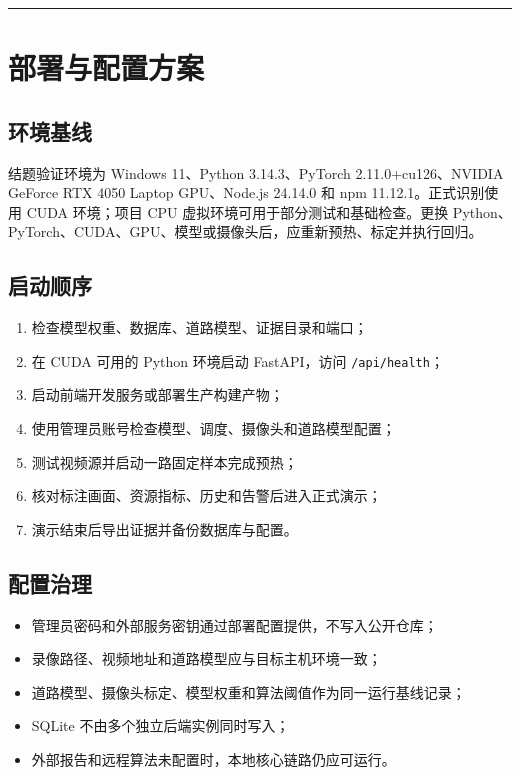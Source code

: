 \begin{center}\rule{0.5\linewidth}{0.5pt}\end{center}

\section{部署与配置方案}\label{design-ux90e8ux7f72ux4e0eux914dux7f6eux65b9ux6848}

\subsection{环境基线}\label{design-ux73afux5883ux57faux7ebf}

结题验证环境为 Windows 11、Python 3.14.3、PyTorch 2.11.0+cu126、NVIDIA GeForce RTX 4050 Laptop GPU、Node.js 24.14.0 和 npm 11.12.1。正式识别使用 CUDA 环境；项目 CPU 虚拟环境可用于部分测试和基础检查。更换 Python、PyTorch、CUDA、GPU、模型或摄像头后，应重新预热、标定并执行回归。

\subsection{启动顺序}\label{design-ux542fux52a8ux987aux5e8f}

\begin{enumerate}
\def\labelenumi{\arabic{enumi}.}
\tightlist
\item
  检查模型权重、数据库、道路模型、证据目录和端口；
\item
  在 CUDA 可用的 Python 环境启动 FastAPI，访问 \texttt{/\allowbreak{}api/\allowbreak{}health}；
\item
  启动前端开发服务或部署生产构建产物；
\item
  使用管理员账号检查模型、调度、摄像头和道路模型配置；
\item
  测试视频源并启动一路固定样本完成预热；
\item
  核对标注画面、资源指标、历史和告警后进入正式演示；
\item
  演示结束后导出证据并备份数据库与配置。
\end{enumerate}

\subsection{配置治理}\label{design-ux914dux7f6eux6cbbux7406}

\begin{itemize}
\tightlist
\item
  管理员密码和外部服务密钥通过部署配置提供，不写入公开仓库；
\item
  录像路径、视频地址和道路模型应与目标主机环境一致；
\item
  道路模型、摄像头标定、模型权重和算法阈值作为同一运行基线记录；
\item
  SQLite 不由多个独立后端实例同时写入；
\item
  外部报告和远程算法未配置时，本地核心链路仍应可运行。
\end{itemize}

